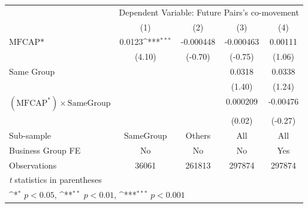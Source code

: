 {
\def\sym#1{\ifmmode^{#1}\else\(^{#1}\)\fi}
\begin{tabular}{l*{4}{c}}
\hline\hline
                &\multicolumn{4}{c}{Dependent Variable:  Future Pairs's co-movement}        \\\cmidrule(lr){2-5}
                &\multicolumn{1}{c}{(1)}         &\multicolumn{1}{c}{(2)}         &\multicolumn{1}{c}{(3)}         &\multicolumn{1}{c}{(4)}         \\
\hline
$ \text{MFCAP*} $&   0.0123\sym{***}&-0.000448         &-0.000463         &  0.00111         \\
                &   (4.10)         &  (-0.70)         &  (-0.75)         &   (1.06)         \\
[1em]
Same Group      &                  &                  &   0.0318         &   0.0338         \\
                &                  &                  &   (1.40)         &   (1.24)         \\
[1em]
 $ (\text{MFCAP}^*) \times {\text{SameGroup} }  $ &                  &                  & 0.000209         & -0.00476         \\
                &                  &                  &   (0.02)         &  (-0.27)         \\
\hline
Sub-sample      &SameGroup         &   Others         &      All         &      All         \\
Business Group FE&       No         &       No         &       No         &      Yes         \\
Observations    &    36061         &   261813         &   297874         &   297874         \\
\hline\hline
\multicolumn{5}{l}{\footnotesize \textit{t} statistics in parentheses}\\
\multicolumn{5}{l}{\footnotesize \sym{*} \(p<0.05\), \sym{**} \(p<0.01\), \sym{***} \(p<0.001\)}\\
\end{tabular}
}
